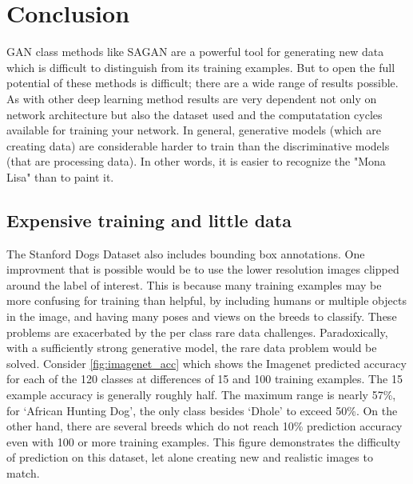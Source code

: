 \documentclass[10pt,twocolumn,letterpaper]{article}
\begin{document}
\section{Conclusion}

GAN class methods like SAGAN are a powerful tool for generating new
data which is difficult to distinguish from its training examples.
But to open the full potential of these methods is difficult; there
are a wide range of results possible. As with other deep learning
method results are very dependent not only on network architecture but
also the dataset used and the computatation cycles available for
training your network. In general, generative models (which are
creating data) are considerable harder to train than the discriminative
models (that are processing data). In other words, it is easier to
recognize the "Mona Lisa" than to paint it.

\subsection{Expensive training and little data}

The Stanford Dogs Dataset also includes bounding box annotations. One improvment
that is possible would be to use the lower resolution images clipped around the
label of interest. This is because many training examples may be more confusing
for training than helpful, by including humans or multiple objects in the image,
and having many poses and views on the breeds to classify. These problems are
exacerbated by the per class rare data challenges. Paradoxically, with a
sufficiently strong generative model, the rare data problem would be solved.
Consider \ref{fig:imagenet_acc} which shows the Imagenet predicted accuracy
for each of the 120 classes at differences of 15 and 100 training examples.
The 15 example accuracy is generally roughly half. The maximum range is
nearly 57\%, for `African Hunting Dog', the only class besides `Dhole' to
exceed 50\%. On the other hand, there are several breeds which do not reach
10\% prediction accuracy even with 100 or more training examples. This
figure demonstrates the difficulty of prediction on this dataset, let alone
creating new and realistic images to match.
\end{document}
